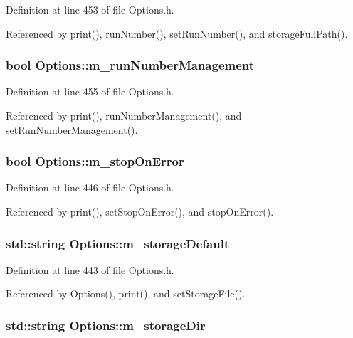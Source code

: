 Definition at line 453 of file Options.h.

Referenced by print(), runNumber(), setRunNumber(), and storageFullPath().\hypertarget{classOptions_a2ad2d67b98fc5fbea4cbbd781ccb6183}{
\subsubsection[{m\_\-runNumberManagement}]{\setlength{\rightskip}{0pt plus 5cm}bool {\bf Options::m\_\-runNumberManagement}}}
\label{classOptions_a2ad2d67b98fc5fbea4cbbd781ccb6183}


Definition at line 455 of file Options.h.

Referenced by print(), runNumberManagement(), and setRunNumberManagement().\hypertarget{classOptions_a879c2741a290595adb3f74633f3a3987}{
\subsubsection[{m\_\-stopOnError}]{\setlength{\rightskip}{0pt plus 5cm}bool {\bf Options::m\_\-stopOnError}}}
\label{classOptions_a879c2741a290595adb3f74633f3a3987}


Definition at line 446 of file Options.h.

Referenced by print(), setStopOnError(), and stopOnError().\hypertarget{classOptions_ab077e872fd03f7bf64f3a354d0c4a2f5}{
\subsubsection[{m\_\-storageDefault}]{\setlength{\rightskip}{0pt plus 5cm}std::string {\bf Options::m\_\-storageDefault}}}
\label{classOptions_ab077e872fd03f7bf64f3a354d0c4a2f5}


Definition at line 443 of file Options.h.

Referenced by Options(), print(), and setStorageFile().\hypertarget{classOptions_a88d9ed92fceb1c91e4df59bc1f81ab3b}{
\subsubsection[{m\_\-storageDir}]{\setlength{\rightskip}{0pt plus 5cm}std::string {\bf Options::m\_\-storageDir}}}
\label{classOptions_a88d9ed92fceb1c91e4df59bc1f81ab3b}


